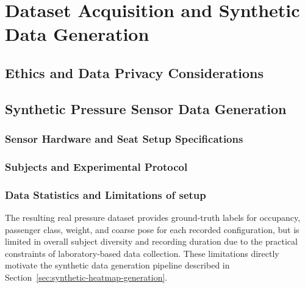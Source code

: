 \chapter{Dataset Acquisition and Synthetic Data Generation}
\label{ch:data-acquisition}

\section{Ethics and Data Privacy Considerations}
\label{sec:ethics-privacy}



\section{ Synthetic Pressure Sensor Data Generation}
\label{sec:synthetic-pressure-data}


\subsection{Sensor Hardware and Seat Setup Specifications}
\label{sec:sensor-hardware-seat-setup}


\subsection{Subjects and Experimental Protocol}
\label{sec:subjects-protocol}



\subsection{Data Statistics and Limitations of setup}
\label{sec:data-statistics-limitations}
The resulting real pressure dataset provides ground-truth labels for
occupancy, passenger class, weight, and coarse pose for each recorded
configuration, but is limited in overall subject diversity and recording
duration due to the practical constraints of laboratory-based data
collection. These limitations directly motivate the synthetic data
generation pipeline described in Section~\ref{sec:synthetic-heatmap-generation}.

